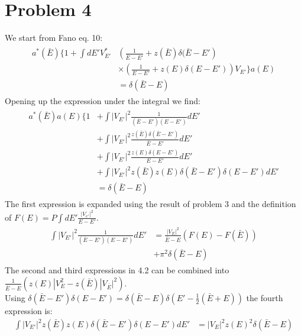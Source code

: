 \documentclass[a4paper,11pt]{article}
\numberwithin{equation}{section}
\newcommand{\pp}[1]{#1'}
\begin{document}
\section{Problem 4}
We start from Fano eq. 10:
\begin{align}
 \begin{split}
 a^*(\bar{E})\{1+\int d\pp{E} V_{\pp{E}}^*
	    &\left(\frac{1}{\bar{E}-\pp{E}}+z(\bar{E})\delta(\bar{E}-\pp{E}\right)\\
	    &\times \left(\frac{1}{E-\pp{E}}+z(E)\delta(E-\pp{E})\right)V_{\pp{E}} \}a(E)\\
	    &= \delta(\bar{E}-E) 
 \end{split}	    
\end{align}
Opening up the expression under the integral we find:
\begin{align}
 \begin{split}
  a^*(\bar{E})a(E)\{1&+\int |V_{\pp{E}}|^2\frac{1}{(\bar{E}-\pp{E})(E-\pp{E})} d\pp{E}\\
	      &+\int |V_{\pp{E}}|^2\frac{z(\bar{E})\delta(\bar{E}-\pp{E})}{\bar{E}-\pp{E}}d\pp{E}\\
	      &+\int |V_{\pp{E}}|^2\frac{z(E)\delta(E-\pp{E})}{E-\pp{E}}    d\pp{E}\\
	      &+\int |V_{\pp{E}}|^2 z(\bar{E})z(E)\delta(\bar{E}-\pp{E})\delta(E-\pp{E})   d\pp{E}\\
	      &= \delta(\bar{E}-E) 
 \end{split}
\end{align}
The first expression is expanded using the result of problem 3 and the definition of $F(E)=P\int d\pp{E} \frac{|V_{\pp{e}}|^2}{E-\pp{E}}$.
\begin{align}
 \begin{split}
  \int |V_{\pp{E}}|^2\frac{1}{(\bar{E}-\pp{E})(E-\pp{E})} d\pp{E} &= \frac{|V_E|^2}{\bar{E}-E}\left(F(E)-F(\bar{E}) \right)\\
			  &+\pi^2\delta(\bar{E}-E)
 \end{split}
\end{align}
The second and third expressions in 4.2 can be combined into $\frac{1}{\bar{E}-E}\left(z(E)|V_E^2-z(\bar{E})|V_{\bar{E}}|^2 \right)$.
\\
Using $\delta(\bar{E}-\pp{E})\delta(E-\pp{E})=\delta(\bar{E}-E)\delta(\pp{E}-\frac{1}{2}(\bar{E}+E))$ the fourth expression is:
\begin{align}
 \int |V_{\pp{E}}|^2 z(\bar{E})z(E)\delta(\bar{E}-\pp{E})\delta(E-\pp{E}) d\pp{E} &= |V_{E}|^2 z(E)^2\delta(\bar{E}-E)
\end{align}
\end{document}
